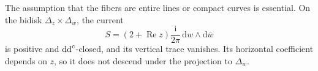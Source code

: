 The assumption that the fibers are entire lines or compact curves is essential. On the bidisk $\Delta_z\times\Delta_w$, the current
\[
 S=(2+\operatorname{Re}z)\frac{\mathrm{i}}{2\pi}\,\mathrm{d}w\wedge\mathrm{d}\bar w
\]
is positive and $\mathrm{dd}^{\mathrm{c}}$-closed, and its vertical trace vanishes. Its horizontal coefficient depends on $z$, so it does not descend under the projection to $\Delta_w$.
